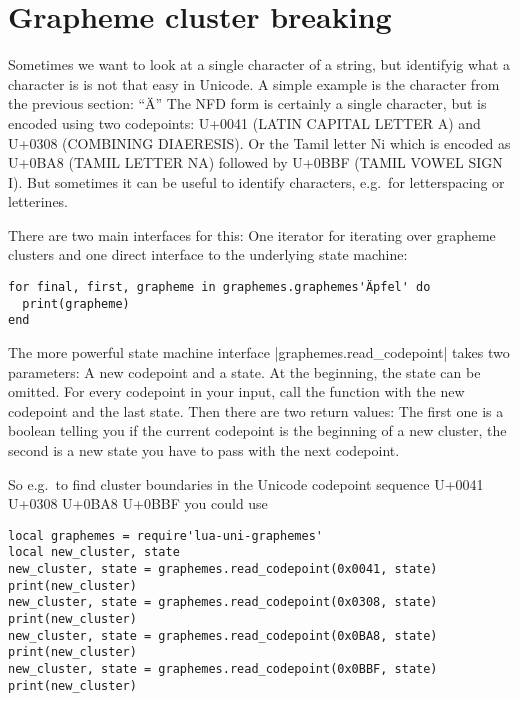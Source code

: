 \documentclass{article}
\begin{document}
\section{Grapheme cluster breaking}
Sometimes we want to look at a single character of a string, but identifyig what a character is is not that easy in Unicode. A simple example is the character from the previous section: ``Ä''
The NFD form is certainly a single character, but is encoded using two codepoints: U+0041 (LATIN CAPITAL LETTER A) and U+0308 (COMBINING DIAERESIS). Or the Tamil letter Ni which is encoded as U+0BA8 (TAMIL LETTER NA) followed by U+0BBF (TAMIL VOWEL SIGN I). But sometimes it can be useful to identify characters, e.g.\ for letterspacing or letterines.

There are two main interfaces for this: One iterator for iterating over grapheme clusters and one direct interface to the underlying state machine:

\begin{verbatim}
for final, first, grapheme in graphemes.graphemes'Äpfel' do
  print(grapheme)
end
\end{verbatim}

\noindent\begingroup
  \ttfamily
  \par
\endgroup

The more powerful state machine interface |graphemes.read_codepoint| takes two parameters: A new codepoint and a state.
At the beginning, the state can be omitted.
For every codepoint in your input, call the function with the new codepoint and the last state. Then there are two return values: The first one is a boolean telling you if the current codepoint is the beginning of a new cluster, the second is a new state you have to pass with the next codepoint.

So e.g.\ to find cluster boundaries in the Unicode codepoint sequence U+0041 U+0308 U+0BA8 U+0BBF you could use

\begin{verbatim}
local graphemes = require'lua-uni-graphemes'
local new_cluster, state
new_cluster, state = graphemes.read_codepoint(0x0041, state)
print(new_cluster)
new_cluster, state = graphemes.read_codepoint(0x0308, state)
print(new_cluster)
new_cluster, state = graphemes.read_codepoint(0x0BA8, state)
print(new_cluster)
new_cluster, state = graphemes.read_codepoint(0x0BBF, state)
print(new_cluster)
\end{verbatim}
  
\end{document}
